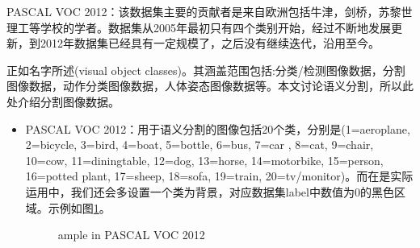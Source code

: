 \documentclass{article}
\begin{document}
\begin{CJK}{UTF8}{gbsn}
PASCAL VOC 2012：该数据集主要的贡献者是来自欧洲包括牛津，剑桥，苏黎世理工等学校的学者。数据集从2005年最初只有四个类别开始，经过不断地发展更新，到2012年数据集已经具有一定规模了，之后没有继续迭代，沿用至今。

正如名字所述(visual object classes)。其涵盖范围包括:分类/检测图像数据，分割图像数据，动作分类图像数据，人体姿态图像数据等。本文讨论语义分割，所以此处介绍分割图像数据。

\begin{itemize}
    \item PASCAL VOC 2012：用于语义分割的图像包括20个类，分别是(1=aeroplane, 2=bicycle, 3=bird, 4=boat, 5=bottle, 6=bus, 7=car , 8=cat, 9=chair, 10=cow, 11=diningtable, 12=dog, 13=horse, 14=motorbike, 15=person, 16=potted plant, 17=sheep, 18=sofa, 19=train, 20=tv/monitor)。而在是实际运用中，我们还会多设置一个类为背景，对应数据集label中数值为0的黑色区域。示例如图\ref{VOC example}。
\begin{figure}
    \centering
    
    \caption{ample in PASCAL VOC 2012}
    \label{VOC example}
\end{figure}


\end{itemize}
\end{CJK}
\end{document}
